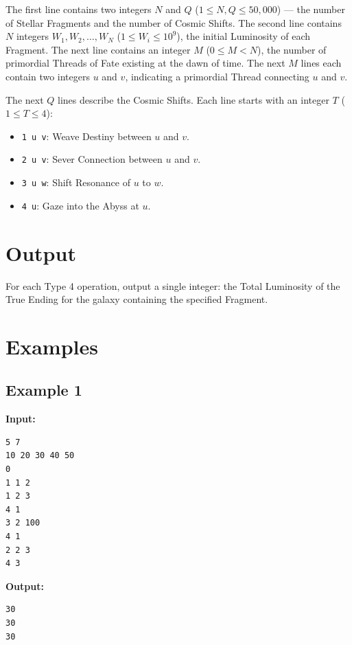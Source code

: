 \documentclass[11pt, letterpaper]{article}
\begin{document}
The first line contains two integers $N$ and $Q$ ($1 \le N, Q \le 50,000$) — the number of Stellar Fragments and the number of Cosmic Shifts.
The second line contains $N$ integers $W_1, W_2, \dots, W_N$ ($1 \le W_i \le 10^9$), the initial Luminosity of each Fragment.
The next line contains an integer $M$ ($0 \le M < N$), the number of primordial Threads of Fate existing at the dawn of time.
The next $M$ lines each contain two integers $u$ and $v$, indicating a primordial Thread connecting $u$ and $v$.

The next $Q$ lines describe the Cosmic Shifts. Each line starts with an integer $T$ ($1 \le T \le 4$):
\begin{itemize}
    \item \texttt{1 u v}: Weave Destiny between $u$ and $v$.
    \item \texttt{2 u v}: Sever Connection between $u$ and $v$.
    \item \texttt{3 u w}: Shift Resonance of $u$ to $w$.
    \item \texttt{4 u}: Gaze into the Abyss at $u$.
\end{itemize}

\section*{Output}

For each Type 4 operation, output a single integer: the Total Luminosity of the True Ending for the galaxy containing the specified Fragment.

\section*{Examples}

\subsection*{Example 1}
\textbf{Input:}
\begin{verbatim}
5 7
10 20 30 40 50
0
1 1 2
1 2 3
4 1
3 2 100
4 1
2 2 3
4 3
\end{verbatim}

\textbf{Output:}
\begin{verbatim}
30
30
30
\end{verbatim}
\end{document}
